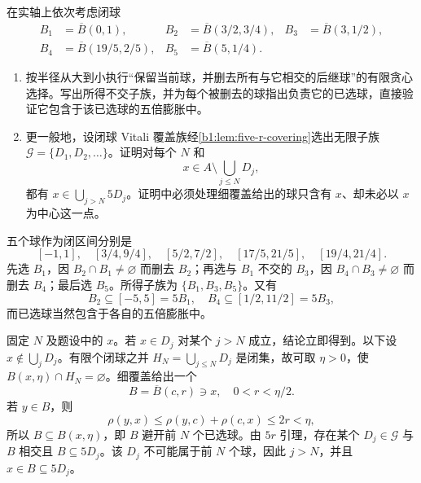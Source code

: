 \BookExercises


\begin{exercise}\label{b1:ex:13-five-r-selection}
在实轴上依次考虑闭球
\[
 \begin{aligned}
 B_1&=\overline B(0,1),
 &B_2&=\overline B(3/2,3/4),
 &B_3&=\overline B(3,1/2),\\
 B_4&=\overline B(19/5,2/5),
 &B_5&=\overline B(5,1/4).
 \end{aligned}
\]
\begin{enumerate}
\item\label{b1:item:13-five-r-finite-selection}
按半径从大到小执行“保留当前球，并删去所有与它相交的后继球”的有限贪心选择。写出所得不交子族，并为每个被删去的球指出负责它的已选球，直接验证它包含于该已选球的五倍膨胀中。
\item\label{b1:item:13-five-r-tail-mechanism}
更一般地，设闭球 Vitali 覆盖族经\cref{b1:lem:five-r-covering}选出无限子族 \(\mathcal G=\{D_1,D_2,\ldots\}\)。证明对每个 \(N\) 和
\[
 x\in A\setminus\bigcup_{j\leq N}D_j,
\]
都有 \(x\in\bigcup_{j>N}5D_j\)。证明中必须处理细覆盖给出的球只含有 \(x\)、却未必以 \(x\) 为中心这一点。
\end{enumerate}
\end{exercise}
\begin{solution}
五个球作为闭区间分别是
\[
 [-1,1],\quad[3/4,9/4],\quad[5/2,7/2],
 \quad[17/5,21/5],\quad[19/4,21/4].
\]
先选 \(B_1\)，因 \(B_2\cap B_1\ne\varnothing\) 而删去 \(B_2\)；再选与 \(B_1\) 不交的 \(B_3\)，因 \(B_4\cap B_3\ne\varnothing\) 而删去 \(B_4\)；最后选 \(B_5\)。所得子族为 \(\{B_1,B_3,B_5\}\)。又有
\[
 B_2\subseteq[-5,5]=5B_1,
 \quad
 B_4\subseteq[1/2,11/2]=5B_3,
\]
而已选球当然包含于各自的五倍膨胀中。

固定 \(N\) 及题设中的 \(x\)。若 \(x\in D_j\) 对某个 \(j>N\) 成立，结论立即得到。以下设 \(x\notin\bigcup_jD_j\)。有限个闭球之并 \(H_N=\bigcup_{j\leq N}D_j\) 是闭集，故可取 \(\eta>0\)，使 \(B(x,\eta)\cap H_N=\varnothing\)。细覆盖给出一个
\[
 B=\overline B(c,r)\ni x,
 \quad 0<r<\eta/2.
\]
若 \(y\in B\)，则
\[
 \rho(y,x)\leq\rho(y,c)+\rho(c,x)\leq2r<\eta,
\]
所以 \(B\subseteq B(x,\eta)\)，即 \(B\) 避开前 \(N\) 个已选球。由 \(5r\) 引理，存在某个 \(D_j\in\mathcal G\) 与 \(B\) 相交且 \(B\subseteq5D_j\)。该 \(D_j\) 不可能属于前 \(N\) 个球，因此 \(j>N\)，并且 \(x\in B\subseteq5D_j\)。
\end{solution}

